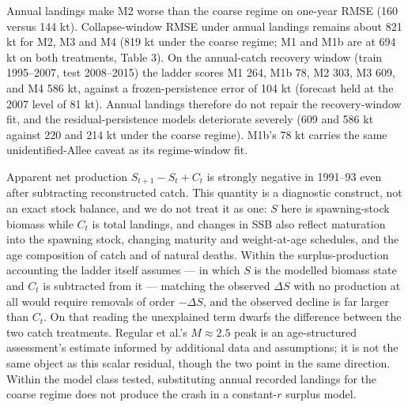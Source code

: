 \documentclass[11pt]{article}
\begin{document}
Annual landings make M2 worse than the coarse regime on one-year RMSE
(160 versus 144 kt). Collapse-window RMSE under annual landings remains
about 821 kt for M2, M3 and M4 (819 kt under the coarse regime; M1 and
M1b are at 694 kt on both treatments, Table 3). On the annual-catch recovery window (train 1995--2007, test 2008--2015)
the ladder scores M1 264, M1b 78, M2 303, M3 609, and M4 586 kt, against
a frozen-persistence error of 104 kt (forecast held at the 2007 level of
81 kt). Annual landings therefore do not repair the recovery-window fit,
and the residual-persistence models deteriorate severely (609 and 586 kt
against 220 and 214 kt under the coarse regime). M1b's 78 kt carries the
same unidentified-Allee caveat as its regime-window fit.

Apparent net production \(S_{t+1}-S_t+C_t\) is strongly negative in
1991--93 even after subtracting reconstructed catch. This quantity is a
diagnostic construct, not an exact stock balance, and we do not treat it
as one: \(S\) here is spawning-stock biomass while \(C_t\) is total
landings, and changes in SSB also reflect maturation into the spawning
stock, changing maturity and weight-at-age schedules, and the age
composition of catch and of natural deaths. Within the surplus-production
accounting the ladder itself assumes --- in which \(S\) is the modelled
biomass state and \(C_t\) is subtracted from it --- matching the observed
\(\Delta S\) with no production at all would require removals of order
\(-\Delta S\), and the observed decline is far larger than \(C_t\). On
that reading the unexplained term dwarfs the difference between the two
catch treatments.
Regular et al.'s \(M \approx 2.5\) peak is an age-structured assessment's
estimate informed by additional data and assumptions; it is not the same
object as this scalar residual, though the two point in the same
direction. Within the model class tested, substituting annual recorded landings
for the coarse regime does not produce the crash in a constant-\(r\)
surplus model.
\end{document}
